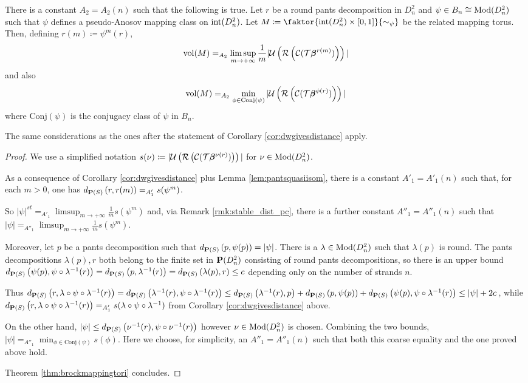 \begin{coroll}\label{cor:dwgivesvolume}
There is a constant $A_2=A_2(n)$ such that the following is true. Let $r$ be a round pants decomposition in $D^2_n$ and $\psi\in B_n\cong \mathrm{Mod}(D^2_n)$ such that $\psi$ defines a pseudo-Anosov mapping class on $\mathrm{int}(D^2_n)$. Let $M\coloneqq \faktor{\inte(D^2_n)\times [0,1]}{\sim_\psi}$ be the related mapping torus. Then, defining $r(m)\coloneqq \psi^m(r)$,
$$
\mathrm{vol}(M) =_{A_2}\limsup_{m\rightarrow+\infty} \frac{1}{m} |{\mathcal U}\left({\mathcal R}\left({\mathcal C}({\mathcal T}\bm\beta^{r(m)})\right)\right)|
$$
and also
$$
\mathrm{vol}(M) =_{A_2} \min_{\phi\in \mathrm{Conj}(\psi)} |{\mathcal U}\left({\mathcal R}\left({\mathcal C}({\mathcal T}\bm\beta^{\phi(r)})\right)\right)|
$$
where $\mathrm{Conj}(\psi)$ is the conjugacy class of $\psi$ in $B_n$.
\end{coroll}
The same considerations as the ones after the statement of Corollary \ref{cor:dwgivesdistance} apply.
\begin{proof}
We use a simplified notation $s(\nu)\coloneqq |{\mathcal U}\left({\mathcal R}\left({\mathcal C}({\mathcal T}\bm\beta^{\nu(r)})\right)\right)|$ for $\nu\in\mathrm{Mod}(D^2_n)$.

As a consequence of Corollary \ref{cor:dwgivesdistance} plus Lemma \ref{lem:pantsquasiisom}, there is a constant $A'_1=A'_1(n)$ such that, for each $m>0$, one has $d_{\mathbf P(S)}\left(r,r(m)\right)=_{A'_1}s(\psi^m)$.

So $|\psi|^{st}=_{A'_1} \limsup_{m\rightarrow+\infty} \frac{1}{m} s(\psi^m)$ and, via Remark \ref{rmk:stable_dist_pc}, there is a further constant $A''_1=A''_1(n)$ such that $|\psi|=_{A''_1} \limsup_{m\rightarrow+\infty} \frac{1}{m} s(\psi^m)$.

Moreover, let $p$ be a pants decomposition such that $d_{\mathbf P(S)}\left(p,\psi(p)\right)=|\psi|$. There is a $\lambda\in \mathrm{Mod}(D^2_n)$ such that $\lambda(p)$ is round. The pants decompositions $\lambda(p),r$ both belong to the finite set in $\mathbf P(D^2_n)$ consisting of round pants decompositions, so there is an upper bound $d_{\mathbf P(S)}\left(\psi(p),\psi\circ \lambda^{-1}(r)\right)=d_{\mathbf P(S)}\left(p,\lambda^{-1}(r)\right)=d_{\mathbf P(S)}\left(\lambda(p),r\right)\leq c$ depending only on the number of strands $n$.

Thus $d_{\pc(S)}\left(r,\lambda\circ \psi \circ \lambda^{-1} (r)\right)= d_{\pc(S)}\left(\lambda^{-1}(r), \psi \circ \lambda^{-1} (r)\right)\leq d_{\pc(S)}\left(\lambda^{-1}(r), p\right) + \linebreak d_{\pc(S)}\left(p, \psi(p)\right) + d_{\pc(S)}\left(\psi(p), \psi \circ \lambda^{-1} (r)\right) \leq |\psi|+2c$, while $d_{\mathbf P(S)}\left(r,\lambda\circ \psi \circ \lambda^{-1} (r)\right) =_{A'_1}
s(\lambda\circ \psi \circ \lambda^{-1})$ from Corollary \ref{cor:dwgivesdistance} above.

On the other hand, $|\psi|\leq d_{\mathbf P(S)}\left(\nu^{-1}(r), \psi \circ \nu^{-1} (r)\right)$ however $\nu\in \mathrm{Mod}(D^2_n)$ is chosen. Combining the two bounds, $|\psi|=_{A''_1} \min_{\phi\in \mathrm{Conj}(\psi)} s(\phi)$. Here we choose, for simplicity, an $A''_1=A''_1(n)$ such that both this coarse equality and the one proved above hold.

Theorem \ref{thm:brockmappingtori} concludes.
\end{proof}

